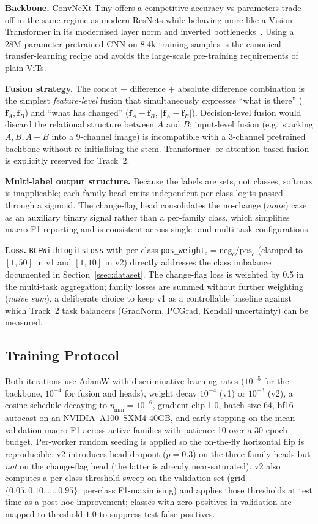 \documentclass[journal]{IEEEtran}
\begin{document}
\textbf{Backbone.} ConvNeXt-Tiny offers a competitive accuracy-vs-parameters trade-off in the same regime as modern ResNets while behaving more like a Vision Transformer in its modernised layer norm and inverted bottlenecks~\cite{liu2022convnext}. Using a 28M-parameter pretrained CNN on 8.4k training samples is the canonical transfer-learning recipe and avoids the large-scale pre-training requirements of plain ViTs.

\textbf{Fusion strategy.} The concat $+$ difference $+$ absolute difference combination is the simplest \emph{feature-level} fusion that simultaneously expresses ``what is there'' ($\mathbf{f}_A,\mathbf{f}_B$) and ``what has changed'' ($\mathbf{f}_A{-}\mathbf{f}_B$, $|\mathbf{f}_A{-}\mathbf{f}_B|$). Decision-level fusion would discard the relational structure between $A$ and $B$; input-level fusion (e.g.~stacking $A,B,A{-}B$ into a 9-channel image) is incompatible with a 3-channel pretrained backbone without re-initialising the stem. Transformer- or attention-based fusion is explicitly reserved for Track~2.

\textbf{Multi-label output structure.} Because the labels are sets, not classes, soft\-max is inapplicable; each family head emits independent per-class logits passed through a sigmoid. The change-flag head consolidates the no-change ($\textit{none}$) case as an auxiliary binary signal rather than a per-family class, which simplifies macro-F1 reporting and is consistent across single- and multi-task configurations.

\textbf{Loss.} \texttt{BCEWithLogitsLoss} with per-class \texttt{pos\_weight}$_c = \text{neg}_c / \text{pos}_c$ (clamped to $[1,50]$ in v1 and $[1,10]$ in v2) directly addresses the class imbalance documented in Section~\ref{ssec:dataset}. The change-flag loss is weighted by 0.5 in the multi-task aggregation; family losses are summed without further weighting (\emph{naive sum}), a deliberate choice to keep v1 as a controllable baseline against which Track~2 task balancers (GradNorm, PCGrad, Kendall uncertainty) can be measured.

\subsection{Training Protocol}\label{ssec:training}

Both iterations use AdamW with discriminative learning rates ($10^{-5}$ for the backbone, $10^{-4}$ for fusion and heads), weight decay $10^{-4}$ (v1) or $10^{-3}$ (v2), a cosine schedule decaying to $\eta_{\min}{=}10^{-6}$, gradient clip 1.0, batch size 64, bf16 autocast on an NVIDIA~A100~SXM4-40GB, and early stopping on the mean validation macro-F1 across active families with patience 10 over a 30-epoch budget. Per-worker random seeding is applied so the on-the-fly horizontal flip is reproducible. v2 introduces head dropout ($p{=}0.3$) on the three family heads but \emph{not} on the change-flag head (the latter is already near-saturated). v2 also computes a per-class threshold sweep on the validation set (grid $\{0.05, 0.10, \ldots, 0.95\}$, per-class F1-maximising) and applies those thresholds at test time as a post-hoc improvement; classes with zero positives in validation are mapped to threshold $1.0$ to suppress test false positives.
\end{document}
